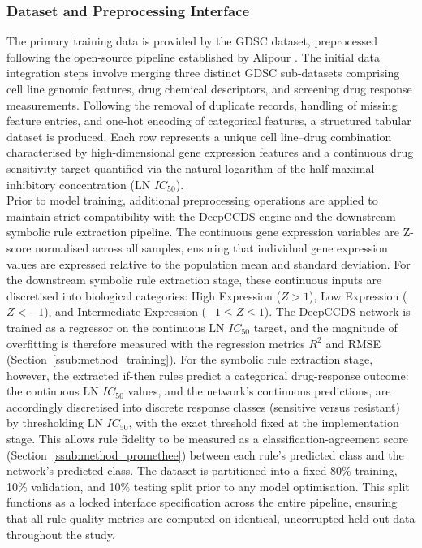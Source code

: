\subsubsection{Dataset and Preprocessing Interface}
\label{ssub:method_dataset}
The primary training data is provided by the GDSC dataset, preprocessed following the 
open-source pipeline established by Alipour \cite{Alipour2024}. The initial data 
integration steps involve merging three distinct GDSC sub-datasets comprising cell line 
genomic features, drug chemical descriptors, and screening drug response measurements. 
Following the removal of duplicate records, handling of missing feature entries, and 
one-hot encoding of categorical features, a structured tabular dataset is produced. Each 
row represents a unique cell line--drug combination characterised by high-dimensional 
gene expression features and a continuous drug sensitivity target quantified via the 
natural logarithm of the half-maximal inhibitory concentration ($\text{LN } IC_{50}$). 
\\
Prior to model training, additional preprocessing operations are applied to maintain 
strict compatibility with the DeepCCDS engine and the downstream symbolic rule extraction 
pipeline. The continuous gene expression variables are Z-score normalised across all 
samples, ensuring that individual gene expression values are expressed relative to the 
population mean and standard deviation. For the downstream symbolic rule extraction 
stage, these continuous inputs are discretised into biological categories: High 
Expression ($Z > 1$), Low Expression ($Z < -1$), and Intermediate Expression 
($-1 \le Z \le 1$). The DeepCCDS network is trained as a regressor on the continuous
$\text{LN } IC_{50}$ target, and the magnitude of overfitting is therefore measured with the
regression metrics $R^2$ and RMSE (Section~\ref{ssub:method_training}). For the symbolic rule
extraction stage, however, the extracted if-then rules predict a categorical drug-response outcome:
the continuous $\text{LN } IC_{50}$ values, and the network's continuous predictions, are accordingly
discretised into discrete response classes (sensitive versus resistant) by thresholding
$\text{LN } IC_{50}$, with the exact threshold fixed at the implementation stage. This allows rule
fidelity to be measured as a classification-agreement score (Section~\ref{ssub:method_promethee})
between each rule's predicted class and the network's predicted class. The dataset is partitioned into
a fixed 80\% training, 10\% validation, and 10\% testing split prior to any model optimisation. This
split functions as a locked interface specification across the entire pipeline, ensuring that all
rule-quality metrics are computed on identical, uncorrupted held-out data throughout the study.

